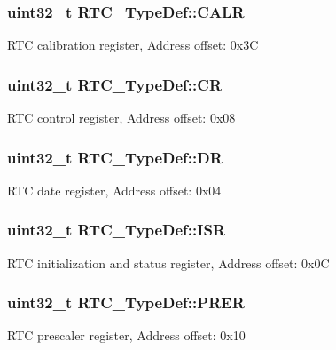\subsubsection[{\texorpdfstring{C\+A\+LR}{CALR}}]{ uint32\+\_\+t R\+T\+C\+\_\+\+Type\+Def\+::\+C\+A\+LR}\hypertarget{struct_r_t_c___type_def_aea66ea813830c2f3ff207464794397a4}{}\label{struct_r_t_c___type_def_aea66ea813830c2f3ff207464794397a4}
R\+TC calibration register, Address offset\+: 0x3C 
\subsubsection[{\texorpdfstring{CR}{CR}}]{ uint32\+\_\+t R\+T\+C\+\_\+\+Type\+Def\+::\+CR}\hypertarget{struct_r_t_c___type_def_a731d9209ce40dce6ea61fcc6f818c892}{}\label{struct_r_t_c___type_def_a731d9209ce40dce6ea61fcc6f818c892}
R\+TC control register, Address offset\+: 0x08 
\subsubsection[{\texorpdfstring{DR}{DR}}]{ uint32\+\_\+t R\+T\+C\+\_\+\+Type\+Def\+::\+DR}\hypertarget{struct_r_t_c___type_def_a8750eae683cb3d382476dc7cdcd92b96}{}\label{struct_r_t_c___type_def_a8750eae683cb3d382476dc7cdcd92b96}
R\+TC date register, Address offset\+: 0x04 
\subsubsection[{\texorpdfstring{I\+SR}{ISR}}]{ uint32\+\_\+t R\+T\+C\+\_\+\+Type\+Def\+::\+I\+SR}\hypertarget{struct_r_t_c___type_def_a5a7b104d80b48b5708b50cdc487d6a78}{}\label{struct_r_t_c___type_def_a5a7b104d80b48b5708b50cdc487d6a78}
R\+TC initialization and status register, Address offset\+: 0x0C 
\subsubsection[{\texorpdfstring{P\+R\+ER}{PRER}}]{ uint32\+\_\+t R\+T\+C\+\_\+\+Type\+Def\+::\+P\+R\+ER}\hypertarget{struct_r_t_c___type_def_a5f43a11e0873212f598e41db5f2dcf6a}{}\label{struct_r_t_c___type_def_a5f43a11e0873212f598e41db5f2dcf6a}
R\+TC prescaler register, Address offset\+: 0x10 

